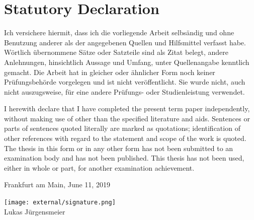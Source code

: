 \documentclass[12pt,a4paper]{article}
\begin{document}




\clearpage


\newpage
\thispagestyle{empty}
\section*{Statutory Declaration}

Ich versichere hiermit, dass ich die vorliegende Arbeit selbs\"andig und ohne Benutzung anderer als der angegebenen Quellen und Hilfsmittel verfasst habe. W\"ortlich \"ubernommene S\"atze oder Satzteile sind als Zitat belegt, andere Anlehnungen, hinsichtlich Aussage und Umfang, unter Quellenangabe kenntlich gemacht. Die Arbeit hat in gleicher oder \"ahnlicher Form noch keiner Pr\"ufungsbeh\"orde vorgelegen und ist nicht ver\"offentlicht. Sie wurde nicht, auch nicht auszugsweise, f\"ur eine andere Pr\"ufungs- oder Studienleistung verwendet.


I herewith declare that I have completed the present term paper independently, without making use of
other than the specified literature and aids. Sentences or parts of sentences quoted literally are
marked as quotations; identification of other references with regard to the statement and scope of
the work is quoted. The thesis in this form or in any other form has not been submitted to an examination body and has not been published.
This thesis has not been used, either in whole or part, for another examination achievement.

\vspace{1cm}

Frankfurt am Main, June 11, 2019

\texttt{[image: external/signature.png]}\\
Lukas J\"urgensmeier
\end{document}
